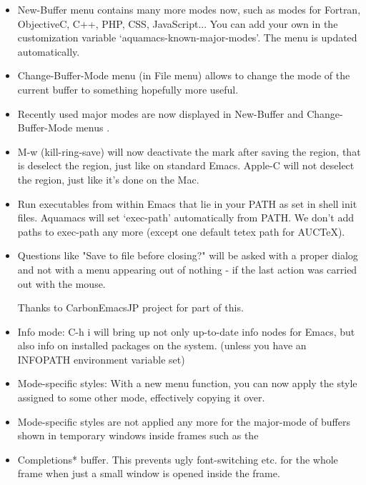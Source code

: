 \begin{itemize}
\item New-Buffer menu contains many more modes now, such as modes for
	Fortran, ObjectiveC, C++, PHP, CSS, JavaScript...
	You can add your own in the customization variable
	`aquamacs-known-major-modes'. The menu is updated automatically.

\item Change-Buffer-Mode menu (in File menu) allows to change the mode
	of the current buffer to something hopefully more useful.
	
\item Recently used major modes are now displayed in New-Buffer and
	Change-Buffer-Mode menus .
	
\item M-w (kill-ring-save) will now deactivate the mark after saving
	the region, that is deselect the region, just like on standard
	Emacs. Apple-C will not deselect the region, just like it's done
	on the Mac. 

      \item Run executables from within Emacs that lie in your PATH as
        set in shell init files. Aquamacs will set `exec-path'
        automatically from PATH.  We don't add paths to exec-path any
        more (except one default tetex path for AUCTeX).

\item Questions like "Save to file before closing?" will be asked with
	a proper dialog and not with a menu appearing out of nothing - if
	the last action was carried out with the mouse.           

	Thanks to CarbonEmacsJP project for part of this.

\item Info mode: C-h i  will bring up not only up-to-date info nodes
	for Emacs, but also info on installed packages on the system.
 	(unless you have an INFOPATH environment variable set)

\item Mode-specific styles: With a new menu function, you can now
	apply the style assigned to some other mode, effectively copying
	it over.

\item Mode-specific styles are not applied any more for the major-mode
	of buffers shown in temporary windows inside frames such as the
\item Completions* buffer. This prevents ugly font-switching etc. for
	the whole frame when just a small window is opened inside the frame.


\end{itemize}
